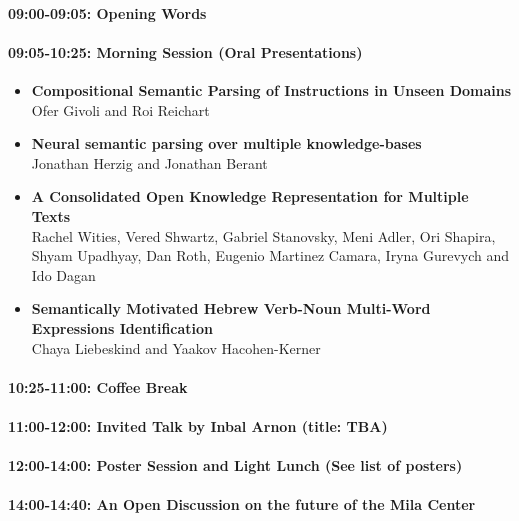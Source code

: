 \documentclass[a0,portrait]{a0poster}
\begin{document}
\paragraph{09:00-09:05: Opening Words}\label{opening-words}

\paragraph{09:05-10:25: Morning Session (Oral
Presentations)}\label{morning-session-oral-presentations}

\begin{itemize}
\item
  \textbf{Compositional Semantic Parsing of Instructions in Unseen
  Domains}\\
  Ofer Givoli and Roi Reichart
\item
  \textbf{Neural semantic parsing over multiple knowledge-bases}\\
  Jonathan Herzig and Jonathan Berant
\item
  \textbf{A Consolidated Open Knowledge Representation for Multiple
  Texts}\\
  Rachel Wities, Vered Shwartz, Gabriel Stanovsky, Meni Adler, Ori
  Shapira, Shyam Upadhyay, Dan Roth, Eugenio Martinez Camara, Iryna
  Gurevych and Ido Dagan
\item
  \textbf{Semantically Motivated Hebrew Verb-Noun Multi-Word Expressions
  Identification}\\
  Chaya Liebeskind and Yaakov Hacohen-Kerner
\end{itemize}

\paragraph{10:25-11:00: Coffee Break}\label{coffee-break}

\paragraph{11:00-12:00: Invited Talk by Inbal Arnon (title:
TBA)}\label{invited-talk-by-inbal-arnon-title-tba}

\paragraph{12:00-14:00: Poster Session and Light Lunch (See list of posters)}\label{poster-session-and-light-lunch-see-list-of-posters}

\paragraph{14:00-14:40: An Open Discussion on the future of the Mila
Center}\label{an-open-discussion-on-the-future-of-the-mila-center}
\end{document}
